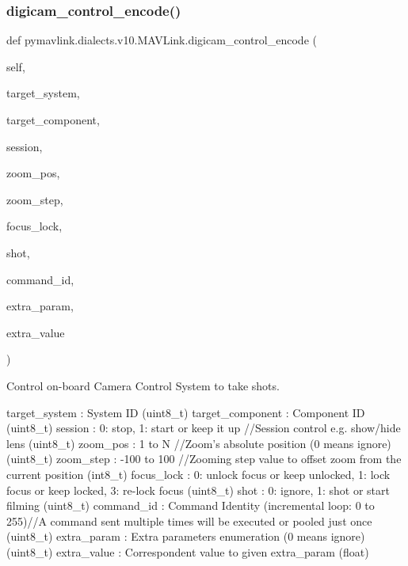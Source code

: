 \begin{DoxyVerb}
\begin{DoxyVerb}
\subsubsection{\texorpdfstring{digicam\+\_\+control\+\_\+encode()}{digicam\_control\_encode()}}
{\footnotesize\ttfamily def pymavlink.\+dialects.\+v10.\+M\+A\+V\+Link.\+digicam\+\_\+control\+\_\+encode (\begin{DoxyParamCaption}\item[{}]{self,  }\item[{}]{target\+\_\+system,  }\item[{}]{target\+\_\+component,  }\item[{}]{session,  }\item[{}]{zoom\+\_\+pos,  }\item[{}]{zoom\+\_\+step,  }\item[{}]{focus\+\_\+lock,  }\item[{}]{shot,  }\item[{}]{command\+\_\+id,  }\item[{}]{extra\+\_\+param,  }\item[{}]{extra\+\_\+value }\end{DoxyParamCaption})}

\begin{DoxyVerb}Control on-board Camera Control System to take shots.

target_system             : System ID (uint8_t)
target_component          : Component ID (uint8_t)
session                   : 0: stop, 1: start or keep it up //Session control e.g. show/hide lens (uint8_t)
zoom_pos                  : 1 to N //Zoom's absolute position (0 means ignore) (uint8_t)
zoom_step                 : -100 to 100 //Zooming step value to offset zoom from the current position (int8_t)
focus_lock                : 0: unlock focus or keep unlocked, 1: lock focus or keep locked, 3: re-lock focus (uint8_t)
shot                      : 0: ignore, 1: shot or start filming (uint8_t)
command_id                : Command Identity (incremental loop: 0 to 255)//A command sent multiple times will be executed or pooled just once (uint8_t)
extra_param               : Extra parameters enumeration (0 means ignore) (uint8_t)
extra_value               : Correspondent value to given extra_param (float)\end{DoxyVerb}
 \mbox{\label{classpymavlink_1_1dialects_1_1v10_1_1MAVLink_a2eb136c77ca8a630287d786c71150d13}} 

\end{DoxyVerb}
\end{DoxyVerb}
